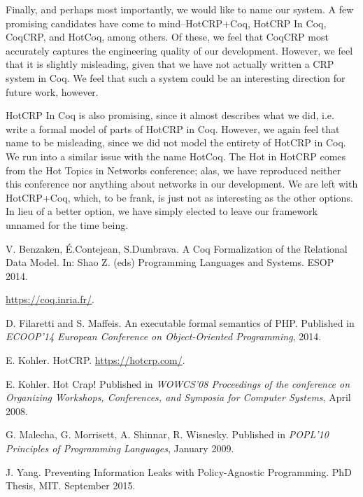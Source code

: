 \documentclass[11pt,journal]{IEEEtran}
\begin{document}
Finally, and perhaps most importantly, we would like to name our system.  A few promising candidates have come to mind--HotCRP+Coq, HotCRP In Coq, CoqCRP, and HotCoq, among others.  Of these, we feel that CoqCRP most accurately captures the engineering quality of our development.  However, we feel that it is slightly misleading, given that we have not actually written a CRP system in Coq.  We feel that such a system could be an interesting direction for future work, however.

HotCRP In Coq is also promising, since it almost describes what we did, i.e. write a formal model of parts of HotCRP in Coq.  However, we again feel that name to be misleading, since we did not model the entirety of HotCRP in Coq.  We run into a similar issue with the name HotCoq.  The Hot in HotCRP comes from the Hot Topics in Networks conference; alas, we have reproduced neither this conference nor anything about networks in our development.\cite{hotcrppaper}  We are left with HotCRP+Coq, which, to be frank, is just not as interesting as the other options.  In lieu of a better option, we have simply elected to leave our framework unnamed for the time being.

\begin{thebibliography}{9}
V. Benzaken, É.Contejean, S.Dumbrava. A Coq Formalization of the Relational Data Model. In: Shao Z. (eds) Programming Languages and Systems. ESOP 2014.

\url{https://coq.inria.fr/}.

D. Filaretti and S. Maffeis. An executable formal semantics of PHP. Published in \textit{ECOOP'14 European Conference on Object-Oriented Programming}, 2014.

E. Kohler. HotCRP. \url{https://hotcrp.com/}.

E. Kohler. Hot Crap! Published in \textit{WOWCS'08 Proceedings of the conference on Organizing Workshops, Conferences, and Symposia for Computer Systems}, April 2008.

G. Malecha, G. Morrisett, A. Shinnar, R. Wisnesky. Published in \textit{POPL’10 Principles of Programming Languages}, January 2009.

J. Yang. Preventing Information Leaks with Policy-Agnostic Programming. PhD Thesis, MIT. September 2015.

\end{thebibliography}
\end{document}
